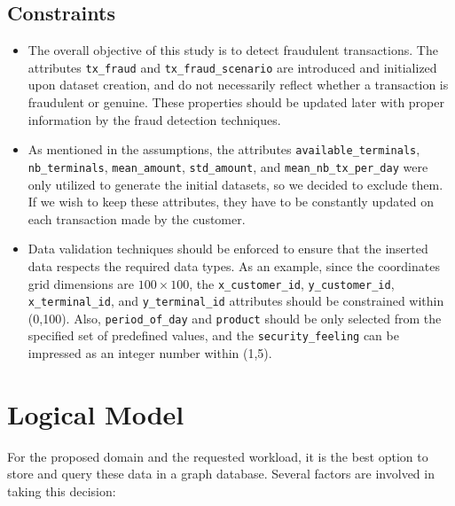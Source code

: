     \hypertarget{constraints}{%
\subsection{Constraints}\label{constraints}}

    \begin{itemize}
\tightlist
\item
  The overall objective of this study is to detect fraudulent
  transactions. The attributes \texttt{tx\_fraud} and
  \texttt{tx\_fraud\_scenario} are introduced and initialized upon
  dataset creation, and do not necessarily reflect whether a transaction
  is fraudulent or genuine. These properties should be updated later
  with proper information by the fraud detection techniques.
\item
  As mentioned in the assumptions, the attributes
  \texttt{available\_terminals}, \texttt{nb\_terminals},
  \texttt{mean\_amount}, \texttt{std\_amount}, and
  \texttt{mean\_nb\_tx\_per\_day} were only utilized to generate the
  initial datasets, so we decided to exclude them. If we wish to keep
  these attributes, they have to be constantly updated on each
  transaction made by the customer.
\item
  Data validation techniques should be enforced to ensure that the
  inserted data respects the required data types. As an example, since
  the coordinates grid dimensions are \(100 \times 100\), the
  \texttt{x\_customer\_id}, \texttt{y\_customer\_id},
  \texttt{x\_terminal\_id}, and \texttt{y\_terminal\_id} attributes
  should be constrained within (0,100). Also, \texttt{period\_of\_day}
  and \texttt{product} should be only selected from the specified set of
  predefined values, and the \texttt{security\_feeling} can be impressed
  as an integer number within (1,5).
\end{itemize}

    \hypertarget{logical-model}{%
\section{Logical Model}\label{logical-model}}

    For the proposed domain and the requested workload, it is the best
option to store and query these data in a graph database. Several
factors are involved in taking this decision:

